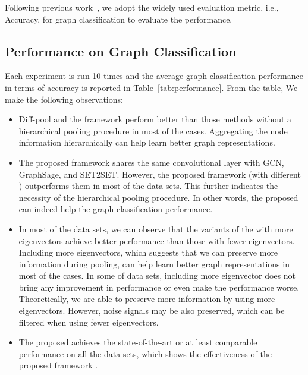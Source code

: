 \documentclass[sigconf]{acmart}
\begin{document}
Following previous work~\cite{ying2018hierarchical}, we adopt the widely used evaluation metric, i.e., Accuracy, for graph classification to evaluate the performance.

\subsection{Performance on Graph Classification}
Each experiment is run 10 times and the average graph classification performance in terms of accuracy is reported in Table~\ref{tab:performance}. From the table, We make the following observations:
\begin{itemize}
    \item Diff-pool and the  framework perform better than those methods without a hierarchical pooling procedure in most of the cases. Aggregating the node information hierarchically can help learn better graph representations.
    \item The proposed framework  shares the same convolutional layer with GCN, GraphSage, and SET2SET. However, the proposed framework (with different ) outperforms them in most of the data sets. This further indicates the necessity of the hierarchical pooling procedure. In other words, the proposed  can indeed help the graph classification performance.  
    \item In most of the data sets, we can observe that the variants of the  with more eigenvectors achieve better performance than those with fewer eigenvectors. Including more eigenvectors, which suggests that we can preserve more information during pooling, can help learn better graph representations in most of the cases. In some of data sets, including more eigenvector does not bring any improvement in performance or even make the performance worse. Theoretically, we are able to preserve more information by using more eigenvectors. However, noise signals may be also preserved, which can be filtered when using fewer eigenvectors. 
    \item The proposed  achieves the state-of-the-art or at least comparable performance on all the data sets, which shows the effectiveness of the proposed framework . 
\end{itemize}
\end{document}
